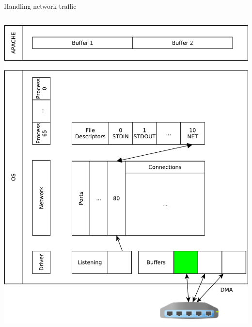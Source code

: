 \documentclass{beamer}
\begin{document}
\begin{frame}[fragile]{Handling network traffic}
\begin{columns}
\begin{column}[t]{0.5\textwidth}
\begin{center}
{  \includegraphics[width=1\linewidth]{sock_mem_4}
     }
\end{center}
\end{column}
\end{columns}
\end{frame}
\end{document}
